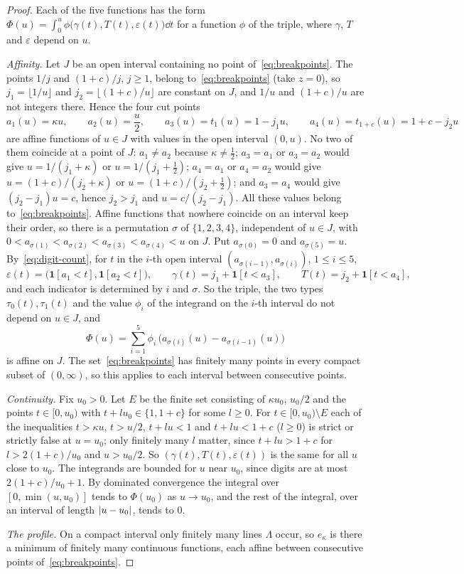 \begin{proof}
Each of the five functions has the form $\Phi(u)=\int_0^u\phi\bigl(\gamma(t),T(t),\varepsilon(t)\bigr)\dd t$
for a function $\phi$ of the triple, where $\gamma$, $T$ and $\varepsilon$ depend on $u$.

\emph{Affinity.} Let $J$ be an open interval containing no point of~\eqref{eq:breakpoints}. The
points $1/j$ and $(1+c)/j$, $j\ge1$, belong to~\eqref{eq:breakpoints} (take $z=0$), so
$j_1=\lfloor1/u\rfloor$ and $j_2=\lfloor(1+c)/u\rfloor$ are constant on $J$, and $1/u$ and
$(1+c)/u$ are not integers there. Hence the four cut points
\[
  a_1(u)=\kappa u,\qquad a_2(u)=\frac u2,\qquad a_3(u)=t_1(u)=1-j_1u,\qquad a_4(u)=t_{1+c}(u)=1+c-j_2u
\]
are affine functions of $u\in J$ with values in the open interval $(0,u)$. No two of them
coincide at a point of $J$: $a_1\ne a_2$ because $\kappa\ne\frac12$; $a_3=a_1$ or $a_3=a_2$ would
give $u=1/(j_1+\kappa)$ or $u=1/(j_1+\frac12)$; $a_4=a_1$ or $a_4=a_2$ would give
$u=(1+c)/(j_2+\kappa)$ or $u=(1+c)/(j_2+\frac12)$; and $a_3=a_4$ would give $(j_2-j_1)u=c$, hence
$j_2>j_1$ and $u=c/(j_2-j_1)$. All these values belong to~\eqref{eq:breakpoints}. Affine functions
that nowhere coincide on an interval keep their order, so there is a permutation $\sigma$ of
$\{1,2,3,4\}$, independent of $u\in J$, with $0<a_{\sigma(1)}<a_{\sigma(2)}<a_{\sigma(3)}<a_{\sigma(4)}<u$
on $J$. Put $a_{\sigma(0)}=0$ and $a_{\sigma(5)}=u$. By~\eqref{eq:digit-count}, for $t$ in the
$i$-th open interval $(a_{\sigma(i-1)},a_{\sigma(i)})$, $1\le i\le5$,
\[
  \varepsilon(t)=\bigl(\mathbf1[a_1<t],\mathbf1[a_2<t]\bigr),\qquad
  \gamma(t)=j_1+\mathbf1[t<a_3],\qquad T(t)=j_2+\mathbf1[t<a_4],
\]
and each indicator is determined by $i$ and $\sigma$. So the triple, the two types
$\tau_0(t),\tau_1(t)$ and the value $\phi_i$ of the integrand on the $i$-th interval do not depend
on $u\in J$, and
\[
  \Phi(u)=\sum_{i=1}^5\phi_i\,\bigl(a_{\sigma(i)}(u)-a_{\sigma(i-1)}(u)\bigr)
\]
is affine on $J$. The set~\eqref{eq:breakpoints} has finitely many points in every compact subset
of $(0,\infty)$, so this applies to each interval between consecutive points.

\emph{Continuity.} Fix $u_0>0$. Let $E$ be the finite set consisting of $\kappa u_0$, $u_0/2$ and
the points $t\in[0,u_0)$ with $t+lu_0\in\{1,1+c\}$ for some $l\ge0$. For $t\in[0,u_0)\setminus E$
each of the inequalities $t>\kappa u$, $t>u/2$, $t+lu<1$ and $t+lu<1+c$ ($l\ge0$) is strict or
strictly false at $u=u_0$; only finitely many $l$ matter, since $t+lu>1+c$ for
$l>2(1+c)/u_0$ and $u>u_0/2$. So $(\gamma(t),T(t),\varepsilon(t))$ is the same for all $u$ close
to $u_0$. The integrands are bounded for $u$ near $u_0$, since digits are at most $2(1+c)/u_0+1$.
By dominated convergence the integral over $[0,\min(u,u_0)]$ tends to $\Phi(u_0)$ as $u\to u_0$,
and the rest of the integral, over an interval of length $\lvert u-u_0\rvert$, tends to $0$.

\emph{The profile.} On a compact interval only finitely many lines $\Lambda$ occur, so $e_\kappa$
is there a minimum of finitely many continuous functions, each affine between consecutive points
of~\eqref{eq:breakpoints}.
\end{proof}

